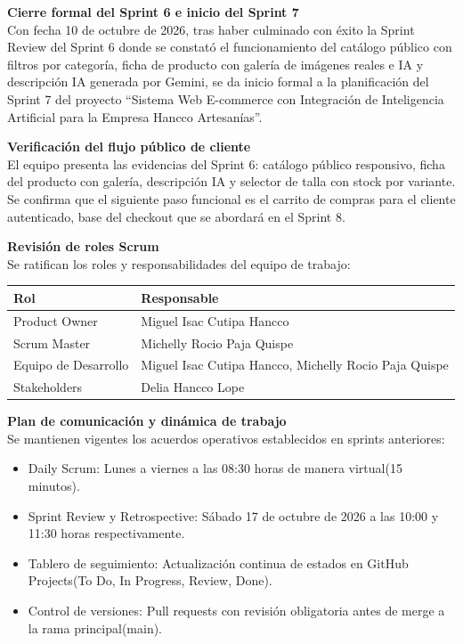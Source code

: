 \documentclass[12pt,a4paper]{article}
\begin{document}
\textbf{Cierre formal del Sprint 6 e inicio del Sprint 7}\\
Con fecha 10 de octubre de 2026, tras haber culminado con éxito la Sprint Review del Sprint 6 donde se constató el funcionamiento del catálogo público con filtros por categoría, ficha de producto con galería de imágenes reales e IA y descripción IA generada por Gemini, se da inicio formal a la planificación del Sprint 7 del proyecto ``Sistema Web E-commerce con Integración de Inteligencia Artificial para la Empresa Hancco Artesanías''.

\textbf{Verificación del flujo público de cliente}\\
El equipo presenta las evidencias del Sprint 6: catálogo público responsivo, ficha del producto con galería, descripción IA y selector de talla con stock por variante. Se confirma que el siguiente paso funcional es el carrito de compras para el cliente autenticado, base del checkout que se abordará en el Sprint 8.

\textbf{Revisión de roles Scrum}\\
Se ratifican los roles y responsabilidades del equipo de trabajo:

\begin{center}
\small
\begin{tabularx}{\textwidth}{p{5cm} L}
\toprule
\textbf{Rol} & \textbf{Responsable} \\
\midrule
Product Owner & Miguel Isac Cutipa Hancco \\
Scrum Master & Michelly Rocio Paja Quispe \\
Equipo de Desarrollo & Miguel Isac Cutipa Hancco, Michelly Rocio Paja Quispe \\
Stakeholders & Delia Hancco Lope \\
\bottomrule
\end{tabularx}
\end{center}

\textbf{Plan de comunicación y dinámica de trabajo}\\
Se mantienen vigentes los acuerdos operativos establecidos en sprints anteriores:

\begin{itemize}
    \item Daily Scrum: Lunes a viernes a las 08:30 horas de manera virtual(15 minutos).
    \item Sprint Review y Retrospective: Sábado 17 de octubre de 2026 a las 10:00 y 11:30 horas respectivamente.
    \item Tablero de seguimiento: Actualización continua de estados en GitHub Projects(To Do, In Progress, Review, Done).
    \item Control de versiones: Pull requests con revisión obligatoria antes de merge a la rama principal(main).
\end{itemize}
\end{document}
